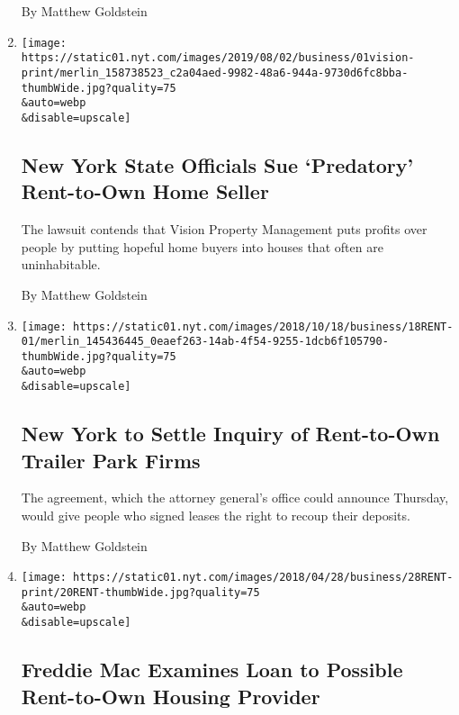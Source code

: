 \begin{enumerate}
  By Matthew Goldstein
\item
  \href{/2019/08/01/business/rent-to-own-vision-lawsuit.html}{}

  \texttt{[image: https://static01.nyt.com/images/2019/08/02/business/01vision-print/merlin\_158738523\_c2a04aed-9982-48a6-944a-9730d6fc8bba-thumbWide.jpg?quality=75\\\&auto=webp\\\&disable=upscale]}

  \hypertarget{new-york-state-officials-sue-predatory-rent-to-own-home-seller}{%
  \subsection{New York State Officials Sue `Predatory' Rent-to-Own Home
  Seller}\label{new-york-state-officials-sue-predatory-rent-to-own-home-seller}}

  The lawsuit contends that Vision Property Management puts profits over
  people by putting hopeful home buyers into houses that often are
  uninhabitable.

  By Matthew Goldstein
\item
  \href{/2018/10/18/business/trailer-park-rent-settlement.html}{}

  \texttt{[image: https://static01.nyt.com/images/2018/10/18/business/18RENT-01/merlin\_145436445\_0eaef263-14ab-4f54-9255-1dcb6f105790-thumbWide.jpg?quality=75\\\&auto=webp\\\&disable=upscale]}

  \hypertarget{new-york-to-settle-inquiry-of-rent-to-own-trailer-park-firms}{%
  \subsection{New York to Settle Inquiry of Rent-to-Own Trailer Park
  Firms}\label{new-york-to-settle-inquiry-of-rent-to-own-trailer-park-firms}}

  The agreement, which the attorney general's office could announce
  Thursday, would give people who signed leases the right to recoup
  their deposits.

  By Matthew Goldstein
\item
  \href{/2018/04/27/business/freddie-mac-affordable-housing-rent-to-own.html}{}

  \texttt{[image: https://static01.nyt.com/images/2018/04/28/business/28RENT-print/20RENT-thumbWide.jpg?quality=75\\\&auto=webp\\\&disable=upscale]}

  \hypertarget{freddie-mac-examines-loan-to-possible-rent-to-own-housing-provider}{%
  \subsection{Freddie Mac Examines Loan to Possible Rent-to-Own Housing
  Provider}\label{freddie-mac-examines-loan-to-possible-rent-to-own-housing-provider}}


\end{enumerate}
